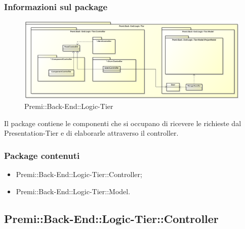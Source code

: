 	\subsubsection*{Informazioni sul package}
	\begin{figure}[h]
		\centering
		\includegraphics[width=\linewidth]{img/back-end_logic-tier_package}
		\caption[Premi::Back-End::Logic-Tier]{Premi::Back-End::Logic-Tier}
	\end{figure}
	Il package contiene le componenti che si occupano di ricevere le richieste dal Presentation-Tier e di elaborarle attraverso il controller.
	
	\subsubsection*{Package contenuti}
	\begin{itemize}
		\item Premi::Back-End::Logic-Tier::Controller;
		\item Premi::Back-End::Logic-Tier::Model.
	\end{itemize}

\newpage

\subsection{Premi::Back-End::Logic-Tier::Controller}
